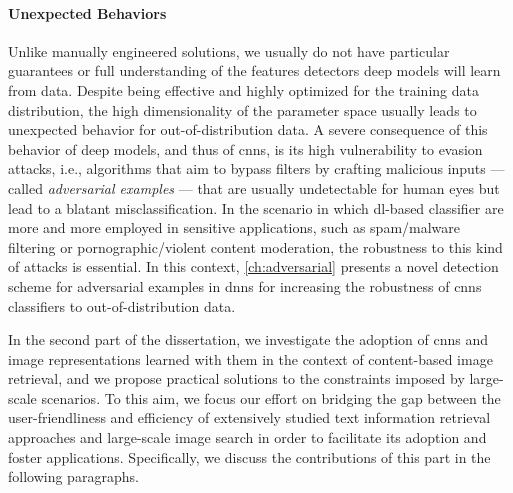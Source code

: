 \paragraph{Unexpected Behaviors}
Unlike manually engineered solutions, we usually do not have particular guarantees or full understanding of the features detectors deep models will learn from data.
Despite being effective and highly optimized for the training data distribution, the high dimensionality of the parameter space usually leads to unexpected behavior for out-of-distribution data.
A severe consequence of this behavior of deep models, and thus of \glspl{cnn}, is its high vulnerability to evasion attacks, i.e., algorithms that aim to bypass filters by crafting malicious inputs --- called \emph{adversarial examples} --- that are usually undetectable for human eyes but lead to a blatant misclassification.
In the scenario in which \gls{dl}-based classifier are more and more employed in sensitive applications, such as spam/malware filtering or pornographic/violent content moderation, the robustness to this kind of attacks is essential.
In this context, \ref{ch:adversarial} presents a novel detection scheme for adversarial examples in \glspl{dnn} for increasing the robustness of \glspl{cnn} classifiers to out-of-distribution data.

In the second part of the dissertation, we investigate the adoption of \glspl{cnn} and image representations learned with them in the context of content-based image retrieval, and we propose practical solutions to the constraints imposed by large-scale scenarios.
To this aim, we focus our effort on bridging the gap between the user-friendliness and efficiency of extensively studied text information retrieval approaches and large-scale image search in order to facilitate its adoption and foster applications.
Specifically, we discuss the contributions of this part in the following paragraphs.

